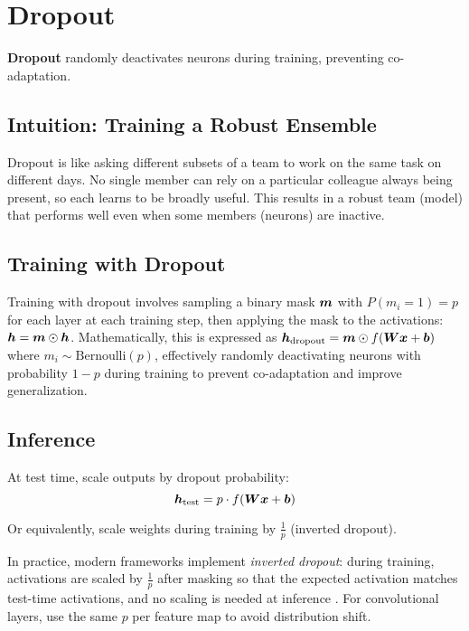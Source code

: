 
\section{Dropout }
\label{sec:dropout}

\textbf{Dropout} randomly deactivates neurons during training, preventing co-adaptation.

\subsection{Intuition: Training a Robust Ensemble}

Dropout is like asking different subsets of a team to work on the same task on different days. No single member can rely on a particular colleague always being present, so each learns to be broadly useful. This results in a robust team (model) that performs well even when some members (neurons) are inactive.

\subsection{Training with Dropout}

Training with dropout involves sampling a binary mask $\boldsymbol{m}$ with $P(m_i = 1) = p$ for each layer at each training step, then applying the mask to the activations: $\boldsymbol{h} = \boldsymbol{m} \odot \boldsymbol{h}$. Mathematically, this is expressed as $\boldsymbol{h}_{\text{dropout}} = \boldsymbol{m} \odot f(\boldsymbol{W}\boldsymbol{x} + \boldsymbol{b})$ where $m_i \sim \text{Bernoulli}(p)$, effectively randomly deactivating neurons with probability $1-p$ during training to prevent co-adaptation and improve generalization.

\subsection{Inference}

At test time, scale outputs by dropout probability:
\begin{equation}
\boldsymbol{h}_{\text{test}} = p \cdot f(\boldsymbol{W}\boldsymbol{x} + \boldsymbol{b})
\end{equation}

Or equivalently, scale weights during training by $\frac{1}{p}$ (inverted dropout).

In practice, modern frameworks implement \emph{inverted dropout}: during training, activations are scaled by $\tfrac{1}{p}$ after masking so that the expected activation matches test-time activations, and no scaling is needed at inference \cite{Srivastava2014,GoodfellowEtAl2016}. For convolutional layers, use the same $p$ per feature map to avoid distribution shift.

